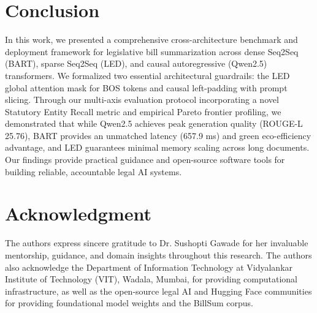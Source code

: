 \documentclass[conference]{IEEEtran}
\begin{document}
\section{Conclusion}
\label{sec:conclusion}
In this work, we presented a comprehensive cross-architecture benchmark and deployment framework for legislative bill summarization across dense Seq2Seq (BART), sparse Seq2Seq (LED), and causal autoregressive (Qwen2.5) transformers. We formalized two essential architectural guardrails: the LED global attention mask for BOS tokens and causal left-padding with prompt slicing. Through our multi-axis evaluation protocol incorporating a novel Statutory Entity Recall metric and empirical Pareto frontier profiling, we demonstrated that while Qwen2.5 achieves peak generation quality (ROUGE-L 25.76), BART provides an unmatched latency (657.9 ms) and green eco-efficiency advantage, and LED guarantees minimal memory scaling across long documents. Our findings provide practical guidance and open-source software tools for building reliable, accountable legal AI systems.

\section*{Acknowledgment}
The authors express sincere gratitude to Dr. Sushopti Gawade for her invaluable mentorship, guidance, and domain insights throughout this research. The authors also acknowledge the Department of Information Technology at Vidyalankar Institute of Technology (VIT), Wadala, Mumbai, for providing computational infrastructure, as well as the open-source legal AI and Hugging Face communities for providing foundational model weights and the BillSum corpus.
\end{document}

